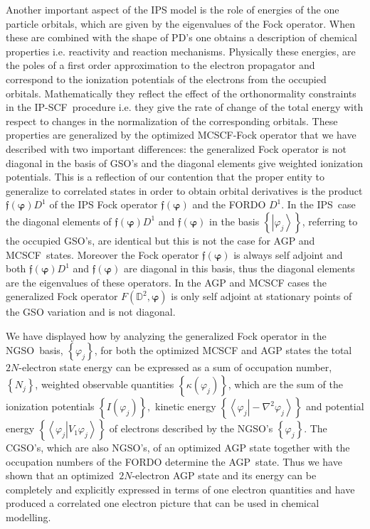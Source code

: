 \documentclass{preprint}
\begin{document}
Another important aspect of the IPS model is the role of energies of the one
particle orbitals, which are given by the eigenvalues of the Fock operator.
When these are combined with the shape of PD's one obtains a description of
chemical properties i.e. reactivity and reaction mechanisms. Physically
these energies, are the poles of a first order approximation to the electron
propagator and correspond to the ionization potentials of the electrons from
the occupied orbitals. Mathematically they reflect the effect of the
orthonormality constraints in the IP-SCF\ procedure i.e. they give the rate
of change of the total energy with respect to changes in the normalization
of the corresponding orbitals. These properties are generalized by the
optimized MCSCF-Fock operator that we have described with two important
differences: the generalized Fock operator is not diagonal in the basis of
GSO's and the diagonal elements give weighted ionization potentials. This is
a reflection of our contention that the proper entity to generalize to
correlated states in order to obtain orbital derivatives is the product $%
\mathfrak{f}\left( \bm{\varphi}\right) D^{1}$ of the IPS Fock operator $%
\mathfrak{f}\left( \bm{\varphi}\right) $ and the FORDO $D^{1}$. In the IPS\
case the diagonal elements of $\mathfrak{f}\left( \bm{\varphi}\right) D^{1}$
and $\mathfrak{f}\left( \bm{\varphi}\right) $ in the basis $\left\{
\left\vert \varphi_{j}\right\rangle \right\} $, referring to the occupied
GSO's, are identical but this is not the case for AGP and MCSCF\ states.
Moreover the Fock operator $\mathfrak{f}\left( \bm{\varphi}\right) $ is
always self adjoint and both $\mathfrak{f}\left( \bm{\varphi}\right) D^{1}$
and $\mathfrak{f}\left( \bm{\varphi}\right) $ are diagonal in this basis,
thus the diagonal elements are the eigenvalues of these operators. In the
AGP and MCSCF cases the generalized Fock operator $F\left( \mathbb{D}^{2},%
\bm{\varphi}\right) $ is only self adjoint at stationary points of the GSO
variation and is not diagonal.

We have displayed how by analyzing the generalized Fock operator in the
NGSO\ basis, $\left\{ \varphi_{j}\right\} $, for both the optimized MCSCF
and AGP states the total $2N$-electron state energy can be expressed as a
sum of occupation number, $\left\{ N_{j}\right\} $, weighted observable
quantities $\left\{ \kappa\left( \varphi_{j}\right) \right\} $, which are
the sum of the ionization potentials $\left\{ I\left( \varphi_{j}\right)
\right\} ,$ kinetic energy $\left\{ \left\langle \left. \varphi
_{j}\right\vert -\nabla^{2}\varphi_{j}\right\rangle \right\} $ and potential
energy $\left\{ \left\langle \left. \varphi_{j}\right\vert V_{1}\varphi
_{j}\right\rangle \right\} $ of electrons described by the NGSO's $\left\{
\varphi_{j}\right\} $. The CGSO's, which are also NGSO's, of an optimized
AGP state together with the occupation numbers of the FORDO determine the
AGP\ state. Thus we have shown that an optimized~$2N$-electron AGP state and
its energy can be completely and explicitly expressed in terms of one
electron quantities and have produced a correlated one electron picture that
can be used in chemical modelling.
\end{document}
